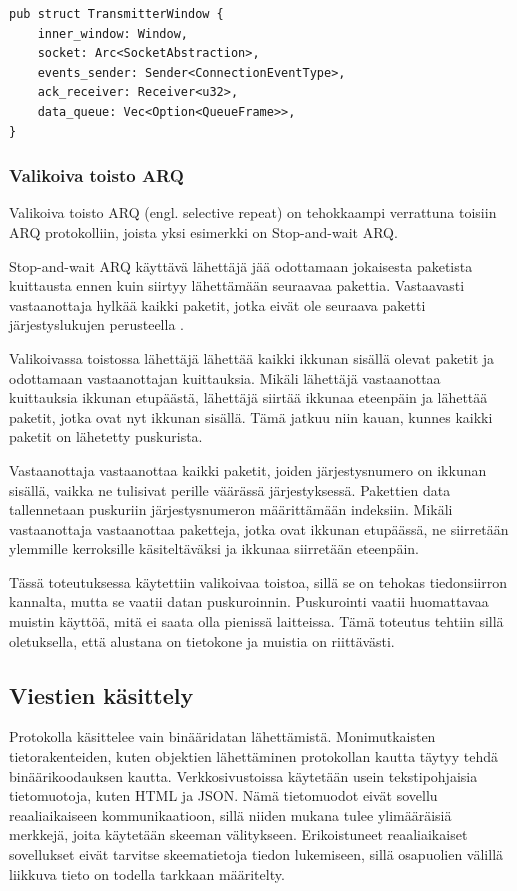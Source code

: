 \documentclass[a4paper,12pt]{article}
\begin{document}
    \begin{lstlisting}[caption={Lähettävän ikkunan rakenne}, label={lst:twindow}]
pub struct TransmitterWindow {
    inner_window: Window,
    socket: Arc<SocketAbstraction>,
    events_sender: Sender<ConnectionEventType>,
    ack_receiver: Receiver<u32>,
    data_queue: Vec<Option<QueueFrame>>,
}\end{lstlisting}

    \subsubsection*{Valikoiva toisto ARQ}\label{subsec:valikoiva_toisto}
    Valikoiva toisto ARQ (engl. selective repeat) on tehokkaampi verrattuna toisiin ARQ protokolliin, joista yksi esimerkki on Stop-and-wait ARQ.

    Stop-and-wait ARQ käyttävä lähettäjä jää odottamaan jokaisesta paketista kuittausta ennen kuin siirtyy lähettämään seuraavaa pakettia. Vastaavasti vastaanottaja hylkää kaikki paketit, jotka eivät ole seuraava paketti järjestyslukujen perusteella \cite{StopAndWaitARQ}.

    Valikoivassa toistossa lähettäjä lähettää kaikki ikkunan sisällä olevat paketit ja odottamaan vastaanottajan kuittauksia. Mikäli lähettäjä vastaanottaa kuittauksia ikkunan etupäästä, lähettäjä siirtää ikkunaa eteenpäin ja lähettää paketit, jotka ovat nyt ikkunan sisällä. Tämä jatkuu niin kauan, kunnes kaikki paketit on lähetetty puskurista. \par

    Vastaanottaja vastaanottaa kaikki paketit, joiden järjestysnumero on ikkunan sisällä, vaikka ne tulisivat perille väärässä järjestyksessä. Pakettien data tallennetaan puskuriin järjestysnumeron määrittämään indeksiin. Mikäli vastaanottaja vastaanottaa paketteja, jotka ovat ikkunan etupäässä, ne siirretään ylemmille kerroksille käsiteltäväksi ja ikkunaa siirretään eteenpäin.

    Tässä toteutuksessa käytettiin valikoivaa toistoa, sillä se on tehokas tiedonsiirron kannalta, mutta se vaatii datan puskuroinnin. Puskurointi vaatii huomattavaa muistin käyttöä, mitä ei saata olla pienissä laitteissa. Tämä toteutus tehtiin sillä oletuksella, että alustana on tietokone ja muistia on riittävästi.\par

    \subsection{Viestien käsittely}
    Protokolla käsittelee vain binääridatan lähettämistä. Monimutkaisten tietorakenteiden, kuten objektien lähettäminen protokollan kautta täytyy tehdä binäärikoodauksen kautta. Verkkosivustoissa käytetään usein tekstipohjaisia tietomuotoja, kuten HTML ja JSON. Nämä tietomuodot eivät sovellu reaaliaikaiseen kommunikaatioon, sillä niiden mukana tulee ylimääräisiä merkkejä, joita käytetään skeeman välitykseen. Erikoistuneet reaaliaikaiset sovellukset eivät tarvitse skeematietoja tiedon lukemiseen, sillä osapuolien välillä liikkuva tieto on todella tarkkaan määritelty.
    \par
\end{document}
